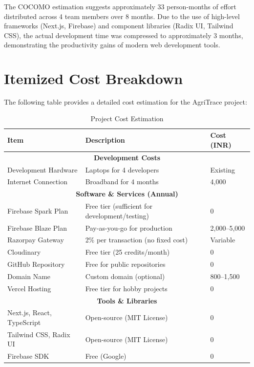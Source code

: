 \documentclass[a4paper,12pt,oneside]{report}
\begin{document}
\noindent The COCOMO estimation suggests approximately 33 person-months of effort distributed across 4 team members over 8 months. Due to the use of high-level frameworks (Next.js, Firebase) and component libraries (Radix UI, Tailwind CSS), the actual development time was compressed to approximately 3 months, demonstrating the productivity gains of modern web development tools.

\section{Itemized Cost Breakdown}

\noindent The following table provides a detailed cost estimation for the AgriTrace project:

\begin{table}[h!]
\centering
\caption{Project Cost Estimation}
\label{tab:cost}
\begin{tabular}{|p{5cm}|p{4cm}|p{3cm}|}
\hline
\textbf{Item} & \textbf{Description} & \textbf{Cost (INR)} \\
\hline
\multicolumn{3}{|c|}{\textbf{Development Costs}} \\
\hline
Development Hardware & Laptops for 4 developers & Existing \\
\hline
Internet Connection & Broadband for 4 months & 4,000 \\
\hline
\multicolumn{3}{|c|}{\textbf{Software \& Services (Annual)}} \\
\hline
Firebase Spark Plan & Free tier (sufficient for development/testing) & 0 \\
\hline
Firebase Blaze Plan & Pay-as-you-go for production & 2,000--5,000 \\
\hline
Razorpay Gateway & 2\% per transaction (no fixed cost) & Variable \\
\hline
Cloudinary & Free tier (25 credits/month) & 0 \\
\hline
GitHub Repository & Free for public repositories & 0 \\
\hline
Domain Name & Custom domain (optional) & 800--1,500 \\
\hline
Vercel Hosting & Free tier for hobby projects & 0 \\
\hline
\multicolumn{3}{|c|}{\textbf{Tools \& Libraries}} \\
\hline
Next.js, React, TypeScript & Open-source (MIT License) & 0 \\
\hline
Tailwind CSS, Radix UI & Open-source (MIT License) & 0 \\
\hline
Firebase SDK & Free (Google) & 0 \\

\end{tabular}
\end{table}
\end{document}
